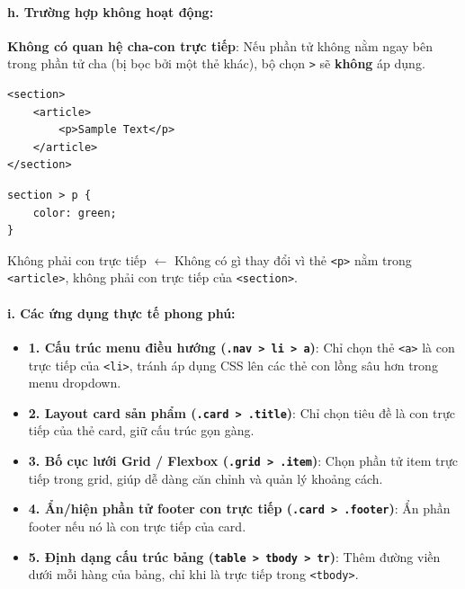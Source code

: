 \documentclass[11pt,oneside]{book}
\newcommand{\codeinline}[1]{\textcolor{accentOrange}{\texttt{#1}}}
\begin{document}
\paragraph{h. Trường hợp không hoạt động:}

\begin{warnBox}
\textbf{Không có quan hệ cha-con trực tiếp}: Nếu phần tử không nằm ngay bên trong phần tử cha (bị bọc bởi một thẻ khác), bộ chọn \codeinline{>} sẽ \textbf{không} áp dụng.
\end{warnBox}

\begin{codeWindow}
\begin{lstlisting}[language=HTML5]
<section>
    <article>
        <p>Sample Text</p>
    </article>
</section>
\end{lstlisting}

\begin{lstlisting}[language=CSS3]
section > p {
    color: green;
}
\end{lstlisting}
\end{codeWindow}

\begin{browserWindow}
\sffamily\small
\textcolor{darkText}{Không phải con trực tiếp} {\small\textcolor{gray!60}{$\leftarrow$ Không có gì thay đổi vì thẻ \codeinline{<p>} nằm trong \codeinline{<article>}, không phải con trực tiếp của \codeinline{<section>}.}}
\end{browserWindow}

\paragraph{i. Các ứng dụng thực tế phong phú:}

\begin{tipBox}
\begin{itemize}[leftmargin=1.5em, itemsep=3pt, parsep=0pt]
    \item \textbf{1. Cấu trúc menu điều hướng (\codeinline{.nav > li > a})}: Chỉ chọn thẻ \codeinline{<a>} là con trực tiếp của \codeinline{<li>}, tránh áp dụng CSS lên các thẻ con lồng sâu hơn trong menu dropdown.
    \item \textbf{2. Layout card sản phẩm (\codeinline{.card > .title})}: Chỉ chọn tiêu đề là con trực tiếp của thẻ card, giữ cấu trúc gọn gàng.
    \item \textbf{3. Bố cục lưới Grid / Flexbox (\codeinline{.grid > .item})}: Chọn phần tử item trực tiếp trong grid, giúp dễ dàng căn chỉnh và quản lý khoảng cách.
    \item \textbf{4. Ẩn/hiện phần tử footer con trực tiếp (\codeinline{.card > .footer})}: Ẩn phần footer nếu nó là con trực tiếp của card.
    \item \textbf{5. Định dạng cấu trúc bảng (\codeinline{table > tbody > tr})}: Thêm đường viền dưới mỗi hàng của bảng, chỉ khi là trực tiếp trong \codeinline{<tbody>}.
\end{itemize}
\end{tipBox}
\end{document}
